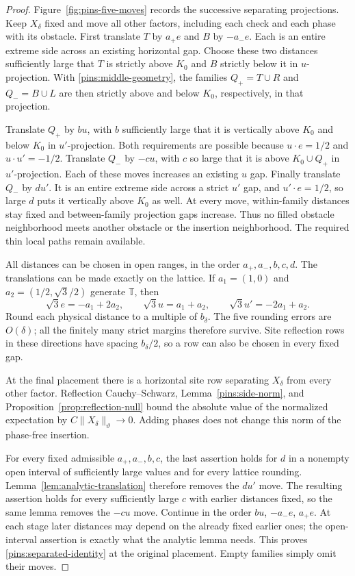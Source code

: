 \documentclass[11pt]{article}
\theoremstyle{definition}
\theoremstyle{remark}
\numberwithin{equation}{section}
\begin{document}
\begin{proof}
Figure~\ref{fig:pins-five-moves} records the successive separating
projections.  Keep $X_\delta$ fixed and move all other factors, including
each check and each phase with its obstacle.  First translate $T$ by $a_+e$ and
$B$ by $-a_-e$.  Each is an entire extreme side across an existing
horizontal gap.  Choose these two distances sufficiently large that
$T$ is strictly above $K_0$ and $B$ strictly below it in
$u$-projection.  With \eqref{pins:middle-geometry}, the families
$Q_+=T\cup R$ and $Q_-=B\cup L$ are then strictly above and below
$K_0$, respectively, in that projection.

Translate $Q_+$ by $bu$, with $b$ sufficiently large that it is
vertically above $K_0$ and below $K_0$ in $u'$-projection.  Both
requirements are possible because
$u\cdot e=1/2$ and $u\cdot u'=-1/2$.  Translate $Q_-$ by $-cu$,
with $c$ so large that it is above $K_0\cup Q_+$ in
$u'$-projection.  Each of these moves increases an existing $u$ gap.
Finally translate $Q_-$ by $du'$.  It is an entire extreme side
across a strict $u'$ gap, and $u'\cdot e=1/2$, so large $d$ puts
it vertically above $K_0$ as well.  At every move, within-family
distances stay fixed and between-family projection gaps increase.
Thus no filled obstacle neighborhood meets another obstacle or the
insertion neighborhood.  The required thin local paths remain available.

All distances can be chosen in open ranges, in the order
$a_+,a_-,b,c,d$.  The translations can be made exactly on the lattice.
If $a_1=(1,0)$ and $a_2=(1/2,\sqrt3/2)$ generate $\mathbb T$, then
\[
 \sqrt3 e=-a_1+2a_2,\qquad
 \sqrt3 u=a_1+a_2,\qquad
 \sqrt3 u'=-2a_1+a_2.
\]
Round each physical distance to a multiple of $b_\delta$.  The five
rounding errors are $O(\delta)$; all the finitely many strict margins
therefore survive.  Site reflection rows in these directions have
spacing $b_\delta/2$, so a row can also be chosen in every fixed gap.

At the final placement there is a horizontal site row separating
$X_\delta$ from every other factor.  Reflection Cauchy--Schwarz,
Lemma~\ref{pins:side-norm}, and
Proposition~\ref{prop:reflection-null} bound the absolute value of
the normalized expectation by $C\|X_\delta\|_\vartheta\to0$.
Adding phases does not change this norm of the phase-free insertion.

For every fixed admissible $a_+,a_-,b,c$, the last assertion holds
for $d$ in a nonempty open interval of sufficiently large values and
for every lattice rounding.  Lemma~\ref{lem:analytic-translation}
therefore removes the $du'$ move.  The resulting assertion holds for
every sufficiently large $c$ with earlier distances fixed, so the same
lemma removes the $-cu$ move.  Continue in the order $bu$, $-a_-e$,
$a_+e$.  At each stage later distances may depend on the already fixed
earlier ones; the open-interval assertion is exactly what the analytic
lemma needs.  This proves \eqref{pins:separated-identity} at the original
placement.  Empty families simply omit their moves.
\end{proof}
\end{document}
